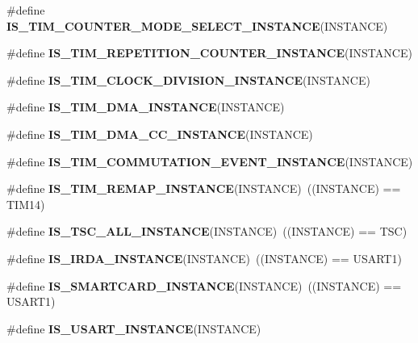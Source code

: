 \begin{DoxyCompactItemize}
\item 
\#define {\bfseries I\+S\+\_\+\+T\+I\+M\+\_\+\+C\+O\+U\+N\+T\+E\+R\+\_\+\+M\+O\+D\+E\+\_\+\+S\+E\+L\+E\+C\+T\+\_\+\+I\+N\+S\+T\+A\+N\+CE}(I\+N\+S\+T\+A\+N\+CE)
\item 
\#define {\bfseries I\+S\+\_\+\+T\+I\+M\+\_\+\+R\+E\+P\+E\+T\+I\+T\+I\+O\+N\+\_\+\+C\+O\+U\+N\+T\+E\+R\+\_\+\+I\+N\+S\+T\+A\+N\+CE}(I\+N\+S\+T\+A\+N\+CE)
\item 
\#define {\bfseries I\+S\+\_\+\+T\+I\+M\+\_\+\+C\+L\+O\+C\+K\+\_\+\+D\+I\+V\+I\+S\+I\+O\+N\+\_\+\+I\+N\+S\+T\+A\+N\+CE}(I\+N\+S\+T\+A\+N\+CE)
\item 
\#define {\bfseries I\+S\+\_\+\+T\+I\+M\+\_\+\+D\+M\+A\+\_\+\+I\+N\+S\+T\+A\+N\+CE}(I\+N\+S\+T\+A\+N\+CE)
\item 
\#define {\bfseries I\+S\+\_\+\+T\+I\+M\+\_\+\+D\+M\+A\+\_\+\+C\+C\+\_\+\+I\+N\+S\+T\+A\+N\+CE}(I\+N\+S\+T\+A\+N\+CE)
\item 
\#define {\bfseries I\+S\+\_\+\+T\+I\+M\+\_\+\+C\+O\+M\+M\+U\+T\+A\+T\+I\+O\+N\+\_\+\+E\+V\+E\+N\+T\+\_\+\+I\+N\+S\+T\+A\+N\+CE}(I\+N\+S\+T\+A\+N\+CE)
\item 
\mbox{\label{group___exported__macro_ga6bb03cf116b07bfe1bd527f8ab61a7f9}} 
\#define {\bfseries I\+S\+\_\+\+T\+I\+M\+\_\+\+R\+E\+M\+A\+P\+\_\+\+I\+N\+S\+T\+A\+N\+CE}(I\+N\+S\+T\+A\+N\+CE)~((I\+N\+S\+T\+A\+N\+CE) == T\+I\+M14)
\item 
\mbox{\label{group___exported__macro_gaf29af2609f6b7748104a965262e95475}} 
\#define {\bfseries I\+S\+\_\+\+T\+S\+C\+\_\+\+A\+L\+L\+\_\+\+I\+N\+S\+T\+A\+N\+CE}(I\+N\+S\+T\+A\+N\+CE)~((I\+N\+S\+T\+A\+N\+CE) == T\+SC)
\item 
\mbox{\label{group___exported__macro_ga98ae6698dc54d8441fce553a65bf5429}} 
\#define {\bfseries I\+S\+\_\+\+I\+R\+D\+A\+\_\+\+I\+N\+S\+T\+A\+N\+CE}(I\+N\+S\+T\+A\+N\+CE)~((I\+N\+S\+T\+A\+N\+CE) == U\+S\+A\+R\+T1)
\item 
\mbox{\label{group___exported__macro_gab2734c105403831749ccb34eeb058988}} 
\#define {\bfseries I\+S\+\_\+\+S\+M\+A\+R\+T\+C\+A\+R\+D\+\_\+\+I\+N\+S\+T\+A\+N\+CE}(I\+N\+S\+T\+A\+N\+CE)~((I\+N\+S\+T\+A\+N\+CE) == U\+S\+A\+R\+T1)
\item 
\#define {\bfseries I\+S\+\_\+\+U\+S\+A\+R\+T\+\_\+\+I\+N\+S\+T\+A\+N\+CE}(I\+N\+S\+T\+A\+N\+CE)

\end{DoxyCompactItemize}
